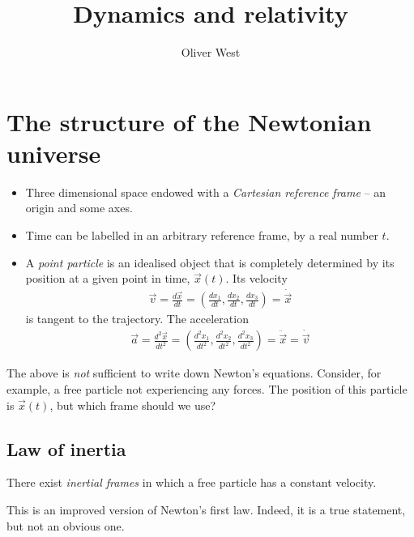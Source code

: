 \documentclass{../template/note}
\author{Oliver West}
\title{Dynamics and relativity}
\date{}
\begin{document}
    \maketitle

    \tableofcontents


    \section{The structure of the Newtonian universe}

    \begin{itemize}
        \item Three dimensional space endowed with a \emph{Cartesian reference frame} -- an origin and some axes.
        \item Time can be labelled in an arbitrary reference frame, by a real number \(t\).
        \item A \emph{point particle} is an idealised object that is completely determined by its position at a given point in time, \(\vec x(t)\). Its velocity
        \begin{align*}
            \vec v = \frac{d \vec x}{dt} = \left(\frac{dx_1}{dt}, \frac{dx_2}{dt}, \frac{dx_3}{dt}\right) = \dot{\vec x}
        \end{align*}
        is tangent to the trajectory. The acceleration
        \begin{align*}
            \vec a = \frac{d^2\vec x}{dt^2} = \left(\frac{d^2x_1}{dt^2}, \frac{d^2x_2}{dt^2}, \frac{d^2x_3}{dt^2}\right) = \ddot{\vec x} = \dot{\vec v}
        \end{align*}
    \end{itemize}
    The above is \emph{not} sufficient to write down Newton's equations. Consider, for example, a free particle not experiencing any forces. The position of this particle is \(\vec x(t)\), but which frame should we use?
    
    \subsection{Law of inertia}

    \begin{proposition}
        There exist \emph{inertial frames} in which a free particle has a constant velocity.
    \end{proposition}
    
    This is an improved version of Newton's first law. Indeed, it is a true statement, but not an obvious one.
\end{document}
